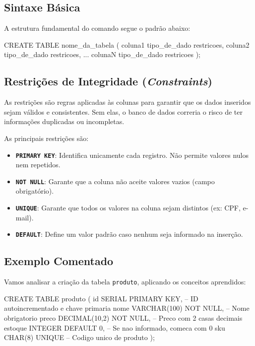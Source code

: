 \documentclass[12pt,a4paper,openright]{book}
\begin{document}
\subsection{Sintaxe Básica}

A estrutura fundamental do comando segue o padrão abaixo:

\begin{sqlcode}
CREATE TABLE nome_da_tabela (
    coluna1 tipo_de_dado restricoes,
    coluna2 tipo_de_dado restricoes,
    ...
    colunaN tipo_de_dado restricoes
);
\end{sqlcode}



\subsection{Restrições de Integridade (\textit{Constraints})}

As restrições são regras aplicadas às colunas para garantir que os dados inseridos sejam válidos e consistentes. Sem elas, o banco de dados correria o risco de ter informações duplicadas ou incompletas.

As principais restrições são:

\begin{itemize}
    \item \textbf{\texttt{PRIMARY KEY}}: Identifica unicamente cada registro. Não permite valores nulos nem repetidos.
    \item \textbf{\texttt{NOT NULL}}: Garante que a coluna não aceite valores vazios (campo obrigatório).
    \item \textbf{\texttt{UNIQUE}}: Garante que todos os valores na coluna sejam distintos (ex: CPF, e-mail).
    \item \textbf{\texttt{DEFAULT}}: Define um valor padrão caso nenhum seja informado na inserção.
\end{itemize}

\subsection{Exemplo Comentado}

Vamos analisar a criação da tabela \texttt{produto}, aplicando os conceitos aprendidos:

\begin{sqlcode}
CREATE TABLE produto (
    id SERIAL PRIMARY KEY,            -- ID autoincrementado e chave primaria
    nome VARCHAR(100) NOT NULL,      -- Nome obrigatorio
    preco DECIMAL(10,2) NOT NULL,    -- Preco com 2 casas decimais
    estoque INTEGER DEFAULT 0,       -- Se nao informado, comeca com 0
    sku CHAR(8) UNIQUE               -- Codigo unico de produto
);
\end{sqlcode}
\end{document}
